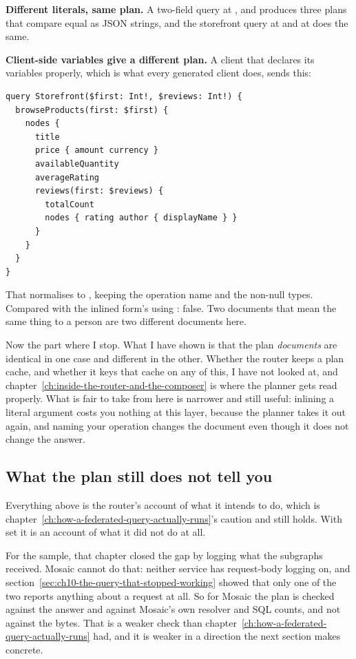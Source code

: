 \medskip\noindent\textbf{Different literals, same plan.} A two-field query at
,  and  produces three plans that
compare equal as JSON strings, and the storefront query at  and at
 does the same.

\medskip\noindent\textbf{Client-side variables give a different plan.} A client
that declares its variables properly, which is what every generated client
does, sends this:

\begin{verbatim}
query Storefront($first: Int!, $reviews: Int!) {
  browseProducts(first: $first) {
    nodes {
      title
      price { amount currency }
      availableQuantity
      averageRating
      reviews(first: $reviews) {
        totalCount
        nodes { rating author { displayName } }
      }
    }
  }
}
\end{verbatim}

That normalises to , keeping the
operation name and the non-null types. Compared with the inlined form's
 using \code{===}: false. Two documents that
mean the same thing to a person are two different documents here.

\medskip
{}%
Now the part where I stop. What I have shown is that the plan \emph{documents}
are identical in one case and different in the other. Whether the router keeps a
plan cache, and whether it keys that cache on any of this, I have not looked at,
and chapter~\ref{ch:inside-the-router-and-the-composer} is where the planner
gets read properly. What is fair to take from here is narrower and still useful:
inlining a literal argument costs you nothing at this layer, because the planner
takes it out again, and naming your operation changes the document even though
it does not change the answer.

\subsection*{What the plan still does not tell you}

Everything above is the router's account of what it intends to do, which is
chapter~\ref{ch:how-a-federated-query-actually-runs}'s caution and still holds.
With  set it is an account of what it did not do at all.

For the sample, that chapter closed the gap by logging what the subgraphs
received. Mosaic cannot do that: neither service has request-body logging on,
and section~\ref{sec:ch10-the-query-that-stopped-working} showed that only one
of the two reports anything about a request at all. So for Mosaic the plan is
checked against the answer and against Mosaic's own resolver and SQL counts,
and not against the bytes. That is a weaker check than
chapter~\ref{ch:how-a-federated-query-actually-runs} had, and it is weaker in a
direction the next section makes concrete.

%

